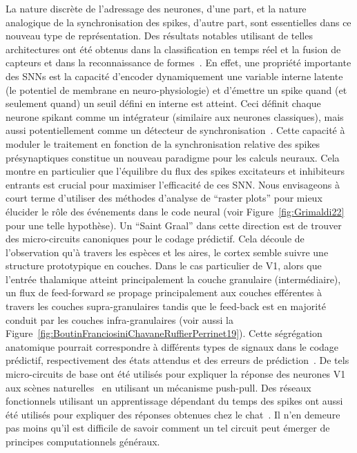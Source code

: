 \documentclass[10pt,french,a4paper]{article}%
\begin{document}
La nature discrète de l'adressage des neurones, d'une part, et la nature analogique de la synchronisation des spikes, d'autre part, sont essentielles dans ce nouveau type de représentation. Des résultats notables utilisant de telles architectures ont été obtenus dans la classification en temps réel et la fusion de capteurs et dans la reconnaissance de formes~\citep{Grimaldi21cbmi,Grimaldi24}. En effet, une propriété importante des SNNs est la capacité d'encoder dynamiquement une variable interne latente (le potentiel de membrane en neuro-physiologie) et d'émettre un spike quand (et seulement quand) un seuil défini en interne est atteint. Ceci définit chaque neurone spikant comme un intégrateur (similaire aux neurones classiques), mais aussi potentiellement comme un détecteur de synchronisation~\citep{Perrinet02stdp}. Cette capacité à moduler le traitement en fonction de la synchronisation relative des spikes présynaptiques constitue un nouveau paradigme pour les calculs neuraux. Cela montre en particulier que l'équilibre du flux des spikes excitateurs et inhibiteurs entrants est crucial pour maximiser l'efficacité de ces SNN. Nous envisageons à court terme d'utiliser des méthodes d'analyse de ``raster plots'' pour mieux élucider le rôle des événements dans le code neural (voir Figure~\ref{fig:Grimaldi22} pour une telle hypothèse).
Un ``Saint Graal'' dans cette direction est de trouver des micro-circuits canoniques pour le codage prédictif. Cela découle de l'observation qu'à travers les espèces et les aires, le cortex semble suivre une structure prototypique en couches. Dans le cas particulier de V1, alors que l'entrée thalamique atteint principalement la couche granulaire (intermédiaire), un flux de feed-forward se propage principalement aux couches efférentes à travers les couches supra-granulaires tandis que le feed-back est en majorité conduit  par les couches infra-granulaires (voir aussi la  Figure~\ref{fig:BoutinFranciosiniChavaneRuffierPerrinet19}). Cette ségrégation anatomique pourrait correspondre à différents types de signaux dans le codage prédictif, respectivement des états attendus et des erreurs de prédiction~\citep{Ladret23}. De tels micro-circuits de base ont été utilisés pour expliquer la réponse des neurones V1 aux scènes naturelles~\citep{Kremkow16} en utilisant un mécanisme push-pull. Des réseaux fonctionnels utilisant un apprentissage dépendant du temps des spikes ont aussi été utilisés pour expliquer des réponses obtenues chez le chat~\citep{Ladret19sfn}. Il n'en demeure pas moins qu'il est difficile de savoir comment un tel circuit peut émerger de principes computationnels généraux.
\end{document}
